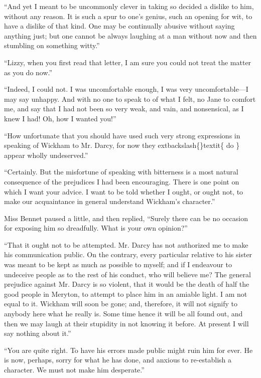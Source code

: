 \documentclass[10pt]{book}
\begin{document}
   “And yet I meant to be uncommonly clever in taking so decided a dislike
to him, without any reason. It is such a spur to one’s genius, such an
opening for wit, to have a dislike of that kind. One may be continually
abusive without saying anything just; but one cannot be always laughing
at a man without now and then stumbling on something witty.”
  

   “Lizzy, when you first read that letter, I am sure you could not treat
the matter as you do now.”
  

   “Indeed, I could not. I was uncomfortable enough, I was very
uncomfortable—I may say unhappy. And with no one to speak to of what I
felt, no Jane to comfort me, and say that I had not been so very weak,
and
   vain, and nonsensical, as I knew I had! Oh, how I wanted you!”
  

   “How unfortunate that you should have used such very strong expressions
in speaking of Wickham to Mr. Darcy, for now they
   	extbackslash\{\}textit\{
    do
   \}
   appear wholly
undeserved.”
  

   “Certainly. But the misfortune of speaking with bitterness is a most
natural consequence of the prejudices I had been encouraging. There is
one point on which I want your advice. I want to be told whether I
ought, or ought not, to make our acquaintance in general understand
Wickham’s character.”
  

   Miss Bennet paused a little, and then replied, “Surely there can be no
occasion for exposing him so dreadfully. What is your own opinion?”
  

   “That it ought not to be attempted. Mr. Darcy has not authorized me to
make his communication public. On the contrary, every particular
relative to his sister was meant to be kept as much as possible to
myself; and if I endeavour to undeceive people as to the rest of his
conduct, who will believe me? The general prejudice against Mr. Darcy is
so violent, that it would be the death of half the good people in
Meryton, to attempt to place him in an amiable light. I am not equal to
it. Wickham will soon be gone; and, therefore, it will not signify to
anybody here what he really is. Some time hence it will be all found
out, and then we may laugh at their stupidity in not knowing it before.
At present I will say nothing about it.”
  

   “You are quite right. To have his errors made public might ruin him for
ever. He is now, perhaps, sorry for what he has done, and anxious to
re-establish a character. We must not make him desperate.”
  
\end{document}
